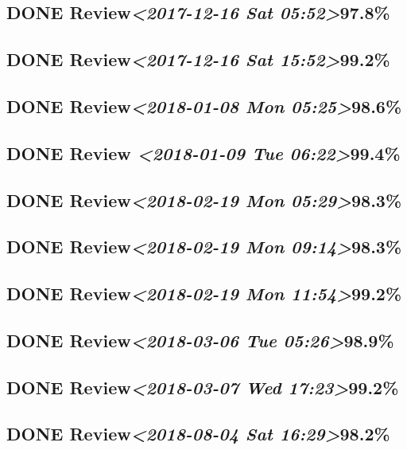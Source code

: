 \documentclass[11pt]{ctexart}
\begin{document}
\subsection{{\bfseries\sffamily DONE} Review\textit{<2017-12-16 Sat 05:52>}97.8\%}
\label{sec:orgdcebec5}
\subsection{{\bfseries\sffamily DONE} Review\textit{<2017-12-16 Sat 15:52>}99.2\%}
\label{sec:orga6a206f}
\subsection{{\bfseries\sffamily DONE} Review\textit{<2018-01-08 Mon 05:25>}98.6\%}
\label{sec:orgc71cd67}
\subsection{{\bfseries\sffamily DONE} Review \textit{<2018-01-09 Tue 06:22>}99.4\%}
\label{sec:orgfed6648}
\subsection{{\bfseries\sffamily DONE} Review\textit{<2018-02-19 Mon 05:29>}98.3\%}
\label{sec:orga1509bb}
\subsection{{\bfseries\sffamily DONE} Review\textit{<2018-02-19 Mon 09:14>}98.3\%}
\label{sec:org145bebb}
\subsection{{\bfseries\sffamily DONE} Review\textit{<2018-02-19 Mon 11:54>}99.2\%}
\label{sec:org3180120}
\subsection{{\bfseries\sffamily DONE} Review\textit{<2018-03-06 Tue 05:26>}98.9\%}
\label{sec:org93a3960}
\subsection{{\bfseries\sffamily DONE} Review\textit{<2018-03-07 Wed 17:23>}99.2\%}
\label{sec:org6d79987}
\subsection{{\bfseries\sffamily DONE} Review\textit{<2018-08-04 Sat 16:29>}98.2\%}
\label{sec:org92dc55c}
\end{document}
